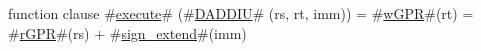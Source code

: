 function clause #\hyperref[zexecute]{execute}# (#\hyperref[zDADDIU]{DADDIU}# (rs, rt, imm)) =
  {
    #\hyperref[zwGPR]{wGPR}#(rt) = #\hyperref[zrGPR]{rGPR}#(rs) + #\hyperref[zsignzyextend]{sign\_extend}#(imm)
  }
